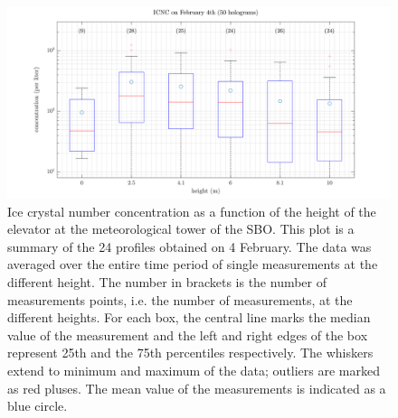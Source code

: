 \documentclass[draft,linenumbers]{agujournal}
\begin{document}
\begin{figure}[h]
 \centering
 	\includegraphics[width=14cm]{0402_Total.png}
 \caption{Ice crystal number concentration as a function of the height of the elevator at the meteorological tower of the SBO. This plot is a summary of the 24 profiles obtained on 4 February. The data was averaged over the entire time period of single measurements at the different height. The number in brackets is the number of measurements points, i.e. the number of measurements, at the different heights. For each box, the central line marks the median value of the measurement and the left and right edges of the box represent 25th and the 75th percentiles respectively. The whiskers extend to minimum and maximum of the data; outliers are marked as red pluses. The mean value of the measurements is indicated as a blue circle.}
 \label{fig:Total0402}
\end{figure}
\end{document}

